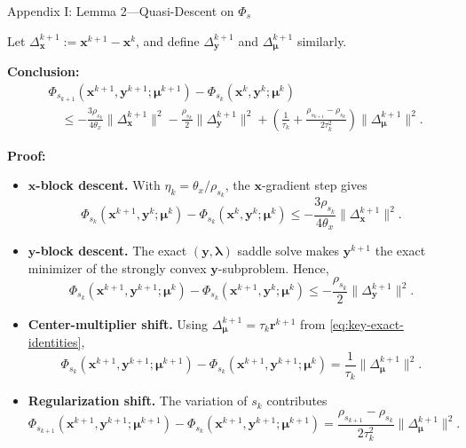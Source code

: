 \documentclass[handout,compress,9pt]{beamer}
\newcommand{\blue}[1]{\textcolor{ddlblue}{#1}}
\newcommand{\bx}{\bm{x}}
\newcommand{\by}{\bm{y}}
\newcommand{\br}{\bm{r}}
\newcommand{\bmu}{\bm{\mu}}
\newcommand{\blmbd}{\bm{\lambda}}
\begin{document}
\begin{frame}{Appendix I: Lemma 2---Quasi-Descent on $\Phi_s$
\hfill\hyperlink{appendix:contents}{}}
\vspace{0.2cm}
\scriptsize


Let $\Delta_{\bx}^{k+1}:=\bx^{k+1}-\bx^k$, and define
$\Delta_{\by}^{k+1}$ and $\Delta_{\bmu}^{k+1}$ similarly.

\noindent\textbf{Conclusion:}
\begin{equation}\label{eq:slide-quasi-descent}
\begin{split}
  &\Phi_{s_{k+1}}(\bx^{k+1},\by^{k+1};\bmu^{k+1})
  -\Phi_{s_k}(\bx^k,\by^k;\bmu^k)\\
  &\quad\leq
  -\frac{3\rho_{s_k}}{4\theta_x}\|\Delta_{\bx}^{k+1}\|^2
  -\frac{\rho_{s_k}}{2}\|\Delta_{\by}^{k+1}\|^2
  +\left(\frac{1}{\tau_k}
  +\frac{\rho_{s_{k+1}}-\rho_{s_k}}{2\tau_k^2}\right)
  \|\Delta_{\bmu}^{k+1}\|^2.
\end{split}
\end{equation}

\noindent\textbf{Proof:}

\begin{itemize}
\setlength{\itemsep}{0.08cm}
\item[\blue{$\triangleright$}]
\textbf{$\bx$-block descent.}
With $\eta_k=\theta_x/\rho_{s_k}$, the $\bx$-gradient step gives
\begin{equation*}
  \Phi_{s_k}(\bx^{k+1},\by^k;\bmu^k)
  -\Phi_{s_k}(\bx^k,\by^k;\bmu^k)
  \leq
  -\frac{3\rho_{s_k}}{4\theta_x}
  \|\Delta_{\bx}^{k+1}\|^2.
\end{equation*}

\item[\blue{$\triangleright$}]
\textbf{$\by$-block descent.}
The exact $(\by,\blmbd)$ saddle solve makes $\by^{k+1}$ the exact minimizer of the strongly convex $\by$-subproblem. Hence,
\begin{equation*}
  \Phi_{s_k}(\bx^{k+1},\by^{k+1};\bmu^k)
  -\Phi_{s_k}(\bx^{k+1},\by^k;\bmu^k)
  \leq
  -\frac{\rho_{s_k}}{2}
  \|\Delta_{\by}^{k+1}\|^2.
\end{equation*}

\item[\blue{$\triangleright$}]
\textbf{Center-multiplier shift.}
Using $\Delta_{\bmu}^{k+1}=\tau_k\br^{k+1}$ from
\eqref{eq:key-exact-identities},
\begin{equation*}
  \Phi_{s_k}(\bx^{k+1},\by^{k+1};\bmu^{k+1})
  -\Phi_{s_k}(\bx^{k+1},\by^{k+1};\bmu^k)
  =\frac{1}{\tau_k}\|\Delta_{\bmu}^{k+1}\|^2.
\end{equation*}

\item[\blue{$\triangleright$}]
\textbf{Regularization shift.}
The variation of $s_k$ contributes
\begin{equation*}
  \Phi_{s_{k+1}}(\bx^{k+1},\by^{k+1};\bmu^{k+1})
  -\Phi_{s_k}(\bx^{k+1},\by^{k+1};\bmu^{k+1})
  =\frac{\rho_{s_{k+1}}-\rho_{s_k}}{2\tau_k^2}
  \|\Delta_{\bmu}^{k+1}\|^2.
\end{equation*}
\end{itemize}

\end{frame}
\end{document}
